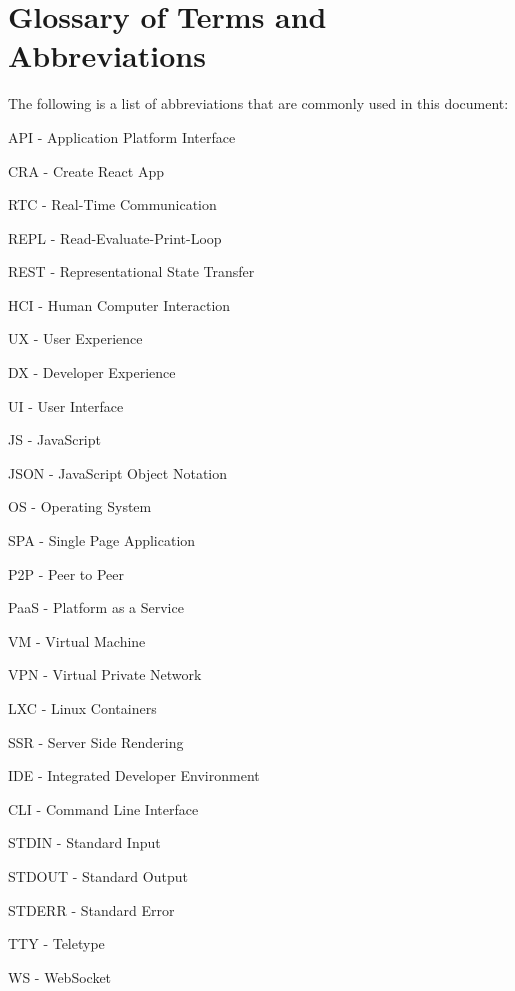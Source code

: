 \section{Glossary of Terms and Abbreviations}
The following is a list of abbreviations that are commonly used in this document:

API - Application Platform Interface

CRA - Create React App

RTC - Real-Time Communication

REPL - Read-Evaluate-Print-Loop

REST - Representational State Transfer

HCI - Human Computer Interaction

UX - User Experience

DX - Developer Experience

UI - User Interface

JS - JavaScript

JSON - JavaScript Object Notation

OS - Operating System

SPA - Single Page Application

P2P - Peer to Peer

PaaS - Platform as a Service

VM - Virtual Machine

VPN - Virtual Private Network

LXC - Linux Containers

SSR - Server Side Rendering

IDE - Integrated Developer Environment

CLI - Command Line Interface 

STDIN - Standard Input

STDOUT - Standard Output

STDERR - Standard Error

TTY - Teletype

WS - WebSocket
\pagebreak
